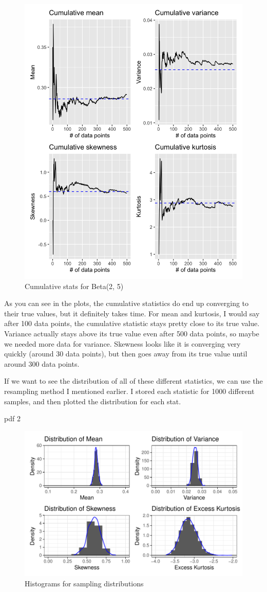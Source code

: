 \documentclass{article}\usepackage[]{graphicx}\usepackage[]{xcolor}
\begin{document}
\begin{multicols}{2}
\begin{figure}[H]
  \centering
  \includegraphics[width=0.6\linewidth]{cumplot.png}
  \caption{Cumulative stats for Beta(2, 5)}
  \label{fig:cumstats}
\end{figure}
As you can see in the plots, the cumulative statistics do end up converging to their true values, but it definitely takes time. For mean and kurtosis, I would say after 100 data points, the cumulative statistic stays pretty close to its true value. Variance actually stays above its true value even after 500 data points, so maybe we needed more data for variance. Skewness looks like it is converging very quickly (around 30 data points), but then goes away from its true value until around 300 data points. 

If we want to see the distribution of all of these different statistics, we can use the resampling method I mentioned earlier. I stored each statistic for 1000 different samples, and then plotted the distribution for each stat.

pdf 
  2 

\begin{figure} [H]
\centering
\includegraphics[width=\linewidth]{resampling.pdf}
\caption{Histograms for sampling distributions}
\label{fig:sampling}
\end{figure}


\end{multicols}
\end{document}
